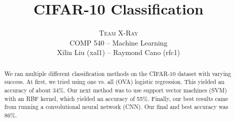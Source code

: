 \documentclass[twoside]{article}
\title{\vspace{-15mm}\fontsize{24pt}{10pt}\selectfont\textbf{CIFAR-10 Classification}} %
\author{
\large
\textsc{Team X-Ray}\\[2mm] %
\normalsize COMP 540 -- Machine Learning \\ %
\normalsize Xilin Liu (xal1) -- Raymond Cano (rfc1) %
\vspace{-5mm}
}
\date{}
\begin{document}
\maketitle %

\thispagestyle{fancy} %


\begin{abstract}

\noindent We ran multiple different classification methods on the CIFAR-10 dataset with varying success. At first, we tried using one vs. all (OVA) logistic regression. This yielded an accuracy of about 34\%. Our next method was to use support vector machines (SVM) with an RBF kernel, which yielded an accuracy of 55\%. Finally, our best results came from running a convolutional neural network (CNN). Our final and best accuracy was 86\%.  
\end{abstract}

\end{document}
